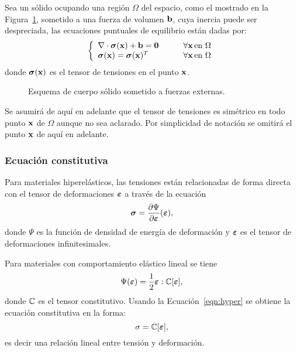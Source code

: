 Sea un sólido ocupando una región $\Omega$ del espacio, como el mostrado en la Figura~\ref{fig:diagrama_solido}, sometido a una fuerza de volumen ${\bf b}$, cuya inercia puede ser despreciada, las ecuaciones puntuales de equilibrio están dadas por:
%
\begin{equation}\label{eqn:equil}
\left\{
\begin{array}{lr}
  \nabla \cdot \boldsymbol{\sigma}({\bf x}) + {\bf b} = \boldsymbol{0} \qquad &\forall {\bf x} \, \text{en } \Omega\\
  \boldsymbol{\sigma}({\bf x}) = \boldsymbol{\sigma}({\bf x})^T \qquad  &\forall {\bf x}\, \text{en } \Omega
\end{array}
\right.
\end{equation}
%
donde $\boldsymbol{\sigma}({\bf x})$ es el tensor de tensiones en el punto ${\bf x}$. %
%

\begin{figure}[htb]
\centering
  \def\svgwidth{0.4\textwidth}
  
\caption{Esquema de cuerpo sólido sometido a fuerzas externas.}
\label{fig:diagrama_solido}
\end{figure}

%
Se asumirá de aquí en adelante que el tensor de tensiones es simétrico en todo punto ${\bf x}$ de $\Omega$ aunque no sea aclarado. %
%
Por simplicidad de notación se omitirá el punto ${\bf x}$ de aquí en adelante. %

\subsubsection*{Ecuación constitutiva}

Para materiales hiperelásticos, las tensiones están relacionadas de forma directa con el tensor de deformaciones $\boldsymbol{\varepsilon}$ a través de la ecuación
%
\begin{equation}\label{eqn:hyper}
  \boldsymbol{\sigma} = \frac{\partial \Psi }{\partial \boldsymbol{\varepsilon}} (\boldsymbol{\varepsilon}),
\end{equation}
%
donde $\Psi$ es la función de densidad de energía de deformación y $\boldsymbol{\varepsilon}$ es el tensor de deformaciones infinitesimales.

Para materiales con comportamiento elástico lineal se tiene
%
\begin{equation}
\Psi (\boldsymbol{\varepsilon}) = \frac{1}{2} \boldsymbol{\varepsilon} : {\mathbb C}[  \boldsymbol{\varepsilon}],
\end{equation}
donde ${\mathbb C}$ es el tensor constitutivo. %
%
Usando la Ecuación~\eqref{eqn:hyper} se obtiene la ecuación constitutiva en la forma: %
%
\begin{equation}
  \sigma = {\mathbb C} [\boldsymbol{\varepsilon}],
\end{equation}
%
es decir una relación lineal entre tensión y deformación.


